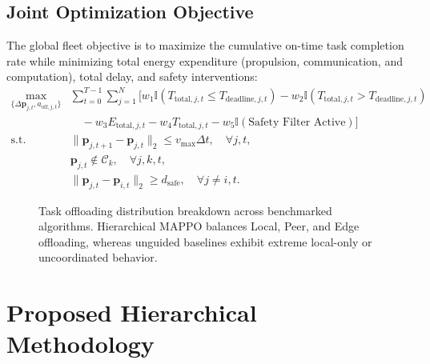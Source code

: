 \documentclass[conference]{IEEEtran}
\begin{document}
\subsection{Joint Optimization Objective}
The global fleet objective is to maximize the cumulative on-time task completion rate while minimizing total energy expenditure (propulsion, communication, and computation), total delay, and safety interventions:
\begin{align}
\max_{\{\Delta \mathbf{p}_{j, t}, a_{\text{off}, j, t}\}} & \sum_{t=0}^{T-1} \sum_{j=1}^N \Big[ w_1 \mathbb{I}(T_{\text{total}, j, t} \le T_{\text{deadline}, j, t}) - w_2 \mathbb{I}(T_{\text{total}, j, t} > T_{\text{deadline}, j, t}) \nonumber \\
& \quad - w_3 E_{\text{total}, j, t} - w_4 T_{\text{total}, j, t} - w_5 \mathbb{I}(\text{Safety Filter Active}) \Big] \\
\text{s.t.} \quad & \|\mathbf{p}_{j, t+1} - \mathbf{p}_{j, t}\|_2 \le v_{\text{max}} \Delta t, \quad \forall j, t, \label{con:speed} \\
& \mathbf{p}_{j, t} \notin \mathcal{C}_k, \quad \forall j, k, t, \label{con:obs} \\
& \|\mathbf{p}_{j, t} - \mathbf{p}_{i, t}\|_2 \ge d_{\text{safe}}, \quad \forall j \neq i, t. \label{con:fleet}
\end{align}

\begin{figure}[!t]
\centering
\caption{Task offloading distribution breakdown across benchmarked algorithms. Hierarchical MAPPO balances Local, Peer, and Edge offloading, whereas unguided baselines exhibit extreme local-only or uncoordinated behavior.}
\label{fig:offload_dist}
\end{figure}

\section{Proposed Hierarchical Methodology}
\label{sec:methodology}
\end{document}
